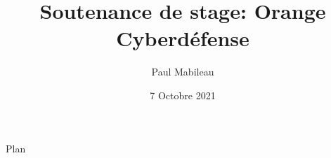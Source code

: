 \documentclass[french, a4paper]{beamer}
\title{Soutenance de stage: Orange Cyberdéfense}
\author{Paul Mabileau}
\institute{Télécom SudParis}
\date{7 Octobre 2021}
\begin{document}
\begin{frame}
    \titlepage{}
\end{frame}

\begin{frame}
    \begin{center}
        {\Large Plan}
    \end{center}
    \tableofcontents[subsubsectionstyle = hide]
\end{frame}
\end{document}
